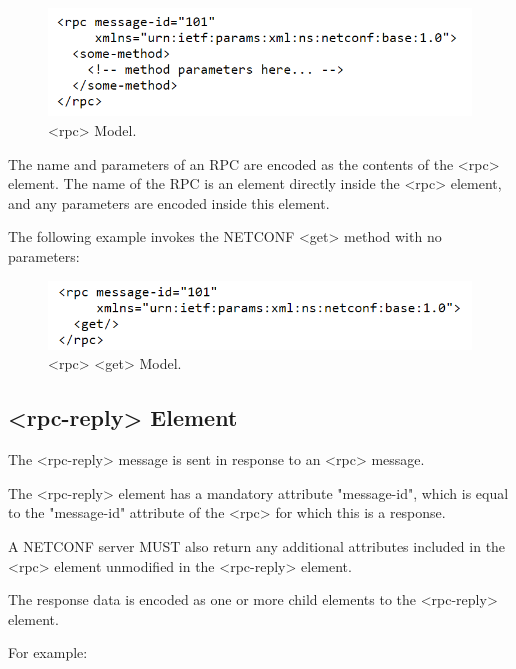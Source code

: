 \begin{figure}[h]
    \centering
    \includegraphics[width=0.7\linewidth]{Images/rpc.png}
    \caption{\textless{rpc}\textgreater{}  Model.}
    \label{fig:example}
\end{figure}

The name and parameters of an RPC are encoded as the contents of the
\textless{rpc}\textgreater{} element.  The name of the RPC is an element directly inside the
\textless{rpc}\textgreater{} element, and any parameters are encoded inside this element.

The following example invokes the NETCONF \textless{get}\textgreater{} method with no
   parameters:


\begin{figure}[h]
    \centering
    \includegraphics[width=0.7\linewidth]{Images/rpc_get.png}
    \caption{\textless{rpc}\textgreater{} \textless{get}\textgreater{} Model.}
    \label{fig:example}
\end{figure}


\subsection*{\textless{rpc-reply}\textgreater{} Element}


The \textless{rpc-reply}\textgreater{} message is sent in response to an \textless{rpc}\textgreater{} message.

The \textless{rpc-reply}\textgreater{} element has a mandatory attribute "message-id", which
is equal to the "message-id" attribute of the \textless{rpc}\textgreater{} for which this is
a response.

A NETCONF server MUST also return any additional attributes included
in the \textless{rpc}\textgreater{} element unmodified in the \textless{rpc-reply}\textgreater{} element.

The response data is encoded as one or more child elements to the
\textless{rpc-reply}\textgreater{} element.

For example:


